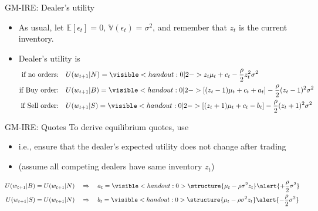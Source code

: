 \documentclass[english,10pt
,aspectratio=169
]{beamer}
\begin{document}
\begin{frame}{GM-IRE: Dealer's utility}
	\begin{itemize}
		\item As usual, let $\mathbb{E}[\epsilon_t] = 0$, $\mathbb{V}(\epsilon_t) = \sigma^2$, and remember that $z_t$ is the current inventory.
		\item Dealer's utility is
		\begin{align*}
			\text{if no orders:}\quad & U(w_{t+1}|N) = \visible<handout:0|2->{ z_t \mu_t + c_t - \frac{\rho}{2}z_t^2 \sigma^2 }
			\\
			\text{if Buy order:}\quad & U(w_{t+1}|B) = \visible<handout:0|2->{ \left[(z_t-1)\mu_t + c_t + a_t\right] - \frac{\rho}{2}(z_t-1)^2 \sigma^2 }
			\\
			\text{if Sell order:}\quad & U(w_{t+1}|S) = \visible<handout:0|2->{ \left[(z_t+1)\mu_t + c_t - b_t\right] - \frac{\rho}{2}(z_t+1)^2 \sigma^2 }
		\end{align*}
	\end{itemize}
\end{frame}


\begin{frame}{GM-IRE: Quotes}
	To derive equilibrium \alert{quotes}, use 
	\begin{itemize}
		\item i.e., ensure that the dealer's expected utility does not change after trading
		\item (assume all competing dealers have same inventory $z_t$)
	\end{itemize}
		\begin{align*}
			U(w_{t+1}|B)=U(w_{t+1}|N) \quad & \Rightarrow \quad a_t = \visible<handout:0>{ \structure{\mu_t - \rho \sigma^2 z_t} \alert{+ \frac{\rho}{2} \sigma^2} }
			\\
			U(w_{t+1}|S)=U(w_{t+1}|N) \quad & \Rightarrow \quad b_t = \visible<handout:0>{ \structure{\mu_t - \rho \sigma^2 z_t} \alert{- \frac{\rho}{2} \sigma^2} }
		\end{align*}
\end{frame}
\end{document}
